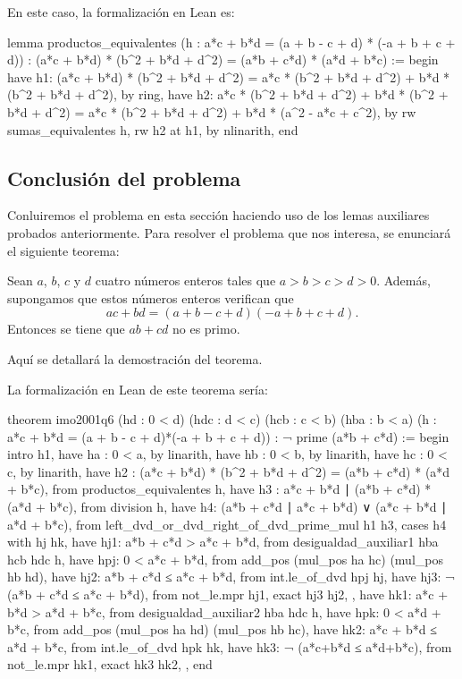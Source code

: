 En este caso, la formalización en Lean es:
\begin{leancode}
lemma productos_equivalentes
  (h : a*c + b*d = (a + b - c + d) * (-a + b + c + d))
  : (a*c + b*d) * (b^2 + b*d + d^2) = (a*b + c*d) * (a*d + b*c) :=
begin
  have h1: (a*c + b*d) * (b^2 + b*d + d^2) =
           a*c * (b^2 + b*d + d^2) + b*d * (b^2 + b*d + d^2),
    by ring,
  have h2: a*c * (b^2 + b*d + d^2) + b*d * (b^2 + b*d + d^2) =
           a*c * (b^2 + b*d + d^2) + b*d * (a^2 - a*c + c^2),
    by rw sumas_equivalentes h,
  rw h2 at h1,
  by nlinarith,
end
\end{leancode}


\subsection{Conclusión del problema}
Conluiremos el problema en esta sección haciendo uso de los lemas auxiliares
probados anteriormente. Para resolver el problema que nos interesa, se
enunciará el siguiente teorema:

\begin{teorema}[imo2001q6]
  Sean \(a\), \(b\), \(c\) y \(d\) cuatro
  números enteros tales que \(a > b > c > d > 0\). Además, supongamos que
  estos números enteros verifican que
    \begin{equation}
      ac+bd = (a+b-c+d)(-a+b+c+d).
    \end{equation}
    Entonces se tiene que \(ab+cd\) no es primo.
\end{teorema}
\begin{demostracion}
  Aquí se detallará la demostración del teorema.
\end{demostracion}

La formalización en Lean de este teorema sería:
\begin{leancode}
theorem imo2001q6
  (hd  : 0 < d)
  (hdc : d < c)
  (hcb : c < b)
  (hba : b < a)
  (h : a*c + b*d = (a + b - c + d)*(-a + b + c + d))
  : ¬ prime (a*b + c*d) :=
begin
  intro h1,
  have ha : 0 < a,
    by linarith,
  have hb : 0 < b,
    by linarith,
  have hc : 0 < c,
    by linarith,
  have h2 : (a*c + b*d) * (b^2 + b*d + d^2) =
            (a*b + c*d) * (a*d + b*c),
    from productos_equivalentes h,
  have h3 : a*c + b*d ∣ (a*b + c*d) * (a*d + b*c),
    from division h,
  have h4: (a*b + c*d ∣ a*c + b*d) ∨ (a*c + b*d  ∣ a*d + b*c),
    from left_dvd_or_dvd_right_of_dvd_prime_mul h1 h3,
  cases h4 with hj hk,
  { have hj1: a*b + c*d > a*c + b*d,
      from desigualdad_auxiliar1 hba hcb hdc h,
    have hpj: 0 < a*c + b*d,
      from add_pos (mul_pos ha hc) (mul_pos hb hd),
    have hj2: a*b + c*d ≤ a*c + b*d,
      from int.le_of_dvd hpj hj,
    have hj3: ¬ (a*b + c*d ≤ a*c + b*d),
      from not_le.mpr hj1,
    exact hj3 hj2, },
  { have hk1: a*c + b*d > a*d + b*c,
      from desigualdad_auxiliar2 hba hdc h,
    have hpk: 0 < a*d + b*c,
      from add_pos (mul_pos ha hd) (mul_pos hb hc),
    have hk2: a*c + b*d ≤ a*d + b*c,
      from int.le_of_dvd hpk hk,
    have hk3: ¬ (a*c+b*d ≤  a*d+b*c),
      from not_le.mpr hk1,
    exact hk3 hk2, },
end
\end{leancode}

